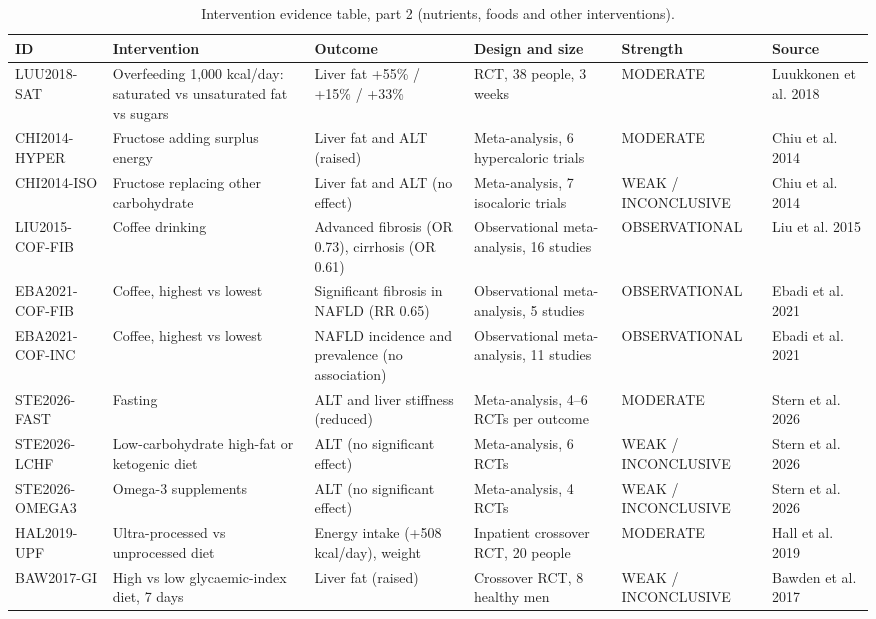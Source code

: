 \begin{table}[htbp]
\centering
\footnotesize
\caption{Intervention evidence table, part 2 (nutrients, foods and other interventions).}
\label{tab:a_evidence2}
\begin{tabularx}{\textwidth}{>{\raggedright\arraybackslash}p{2.3cm}LLLp{1.95cm}L}
\toprule
ID & Intervention & Outcome & Design and size & Strength & Source \\
\midrule
LUU2018-SAT & Overfeeding 1,000 kcal/day: saturated vs unsaturated fat vs sugars & Liver fat +55\% / +15\% / +33\% & RCT, 38 people, 3 weeks & MODERATE & Luukkonen et al. 2018 \\
CHI2014-HYPER & Fructose adding surplus energy & Liver fat and ALT (raised) & Meta-analysis, 6 hypercaloric trials & MODERATE & Chiu et al. 2014 \\
CHI2014-ISO & Fructose replacing other carbohydrate & Liver fat and ALT (no effect) & Meta-analysis, 7 isocaloric trials & WEAK / INCON\-CLUSIVE & Chiu et al. 2014 \\
LIU2015-COF-FIB & Coffee drinking & Advanced fibrosis (OR 0.73), cirrhosis (OR 0.61) & Observational meta-analysis, 16 studies & OBSERVA\-TIONAL & Liu et al. 2015 \\
EBA2021-COF-FIB & Coffee, highest vs lowest & Significant fibrosis in NAFLD (RR 0.65) & Observational meta-analysis, 5 studies & OBSERVA\-TIONAL & Ebadi et al. 2021 \\
EBA2021-COF-INC & Coffee, highest vs lowest & NAFLD incidence and prevalence (no association) & Observational meta-analysis, 11 studies & OBSERVA\-TIONAL & Ebadi et al. 2021 \\
STE2026-FAST & Fasting & ALT and liver stiffness (reduced) & Meta-analysis, 4--6 RCTs per outcome & MODERATE & Stern et al. 2026 \\
STE2026-LCHF & Low-carbohydrate high-fat or ketogenic diet & ALT (no significant effect) & Meta-analysis, 6 RCTs & WEAK / INCON\-CLUSIVE & Stern et al. 2026 \\
STE2026-OMEGA3 & Omega-3 supplements & ALT (no significant effect) & Meta-analysis, 4 RCTs & WEAK / INCON\-CLUSIVE & Stern et al. 2026 \\
HAL2019-UPF & Ultra-processed vs unprocessed diet & Energy intake (+508 kcal/day), weight & Inpatient crossover RCT, 20 people & MODERATE & Hall et al. 2019 \\
BAW2017-GI & High vs low glycaemic-index diet, 7 days & Liver fat (raised) & Crossover RCT, 8 healthy men & WEAK / INCON\-CLUSIVE & Bawden et al. 2017 \\
\bottomrule
\end{tabularx}
\end{table}

